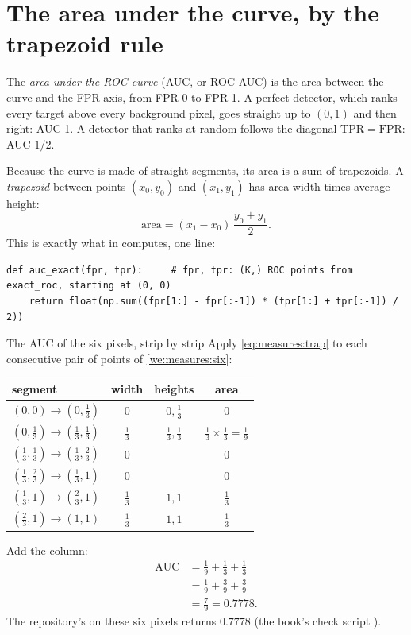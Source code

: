 \section{The area under the curve, by the trapezoid rule}\label{sec:measures:auc}

\begin{definition}[AUC]
The \emph{area under the ROC curve} (AUC, or ROC-AUC) is the area between the curve and the FPR axis,
from FPR 0 to FPR 1. A perfect detector, which ranks every target above every background pixel, goes straight up to
$(0,1)$ and then right: AUC 1. A detector that ranks at random follows the diagonal $\mathrm{TPR} = \mathrm{FPR}$:
AUC $1/2$.
\end{definition}

Because the curve is made of straight segments, its area is a sum of trapezoids. A \emph{trapezoid}
between points $(x_0, y_0)$ and $(x_1, y_1)$ has area width times average height:
\begin{equation}\label{eq:measures:trap}
\text{area} = (x_1 - x_0)\,\frac{y_0 + y_1}{2}.
\end{equation}
This is exactly what  in  computes, one line:
\begin{lstlisting}[basicstyle=\ttfamily\footnotesize]
def auc_exact(fpr, tpr):     # fpr, tpr: (K,) ROC points from exact_roc, starting at (0, 0)
    return float(np.sum((fpr[1:] - fpr[:-1]) * (tpr[1:] + tpr[:-1]) / 2))
\end{lstlisting}

\begin{worked}[label={we:measures:sixauc}]{The AUC of the six pixels, strip by strip}
Apply \cref{eq:measures:trap} to each consecutive pair of points of \cref{we:measures:six}:
\begin{center}
\begin{tabular}{lccc}
\toprule
segment & width & heights & area \\
\midrule
$(0,0) \to (0,\frac13)$ & $0$ & $0, \frac13$ & $0$ \\
$(0,\frac13) \to (\frac13,\frac13)$ & $\frac13$ & $\frac13, \frac13$ & $\frac13 \times \frac13 = \frac19$ \\
$(\frac13,\frac13) \to (\frac13,\frac23)$ & $0$ & & $0$ \\
$(\frac13,\frac23) \to (\frac13,1)$ & $0$ & & $0$ \\
$(\frac13,1) \to (\frac23,1)$ & $\frac13$ & $1, 1$ & $\frac13$ \\
$(\frac23,1) \to (1,1)$ & $\frac13$ & $1, 1$ & $\frac13$ \\
\bottomrule
\end{tabular}
\end{center}
Add the column:
\begin{align*}
\text{AUC} &= \tfrac19 + \tfrac13 + \tfrac13 \\
&= \tfrac19 + \tfrac39 + \tfrac39 \\
&= \tfrac79 = 0.7778.
\end{align*}
The repository's  on these six pixels returns $0.7778$\tagC{} (the book's check script
).
\end{worked}

